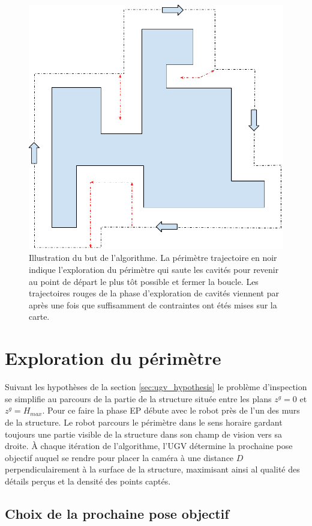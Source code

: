 \begin{figure}[ht]
  \centering
  \includegraphics[width=0.5\linewidth]{images/ugv_goal}
  \caption{Illustration du but de l'algorithme. La périmètre trajectoire en noir indique l'exploration du périmètre qui saute les cavités pour revenir au point de départ le plus tôt possible et fermer la boucle. Les trajectoires rouges de la phase d'exploration de cavités viennent par après une fois que suffisamment de contraintes ont étés mises sur la carte.}
  \label{fig:ugv_overview}
\end{figure}

\section{Exploration du périmètre} \label{sec:perimeter_exploration}

Suivant les hypothèses de la section \ref{sec:ugv_hypothesis} le problème d'inspection se simplifie au parcours de la partie de la structure située entre les plans $z^g = 0$ et $z^g = H_{max}$. Pour ce faire la phase EP débute avec le robot près de l'un des murs de la structure. Le robot parcours le périmètre dans le sens horaire gardant toujours une partie visible de la structure dans son champ de vision vers sa droite. À chaque itération de l'algorithme, l'UGV détermine la prochaine pose objectif auquel se rendre pour placer la caméra à une distance $D$ perpendiculairement à la surface de la structure, maximisant ainsi al qualité des détails perçus et la densité des points captés.

\subsection{Choix de la prochaine pose objectif}

